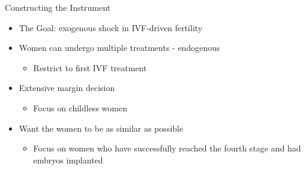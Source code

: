 \documentclass[11pt,notes=hide,aspectratio=169,mathserif]{beamer}
\begin{document}
\begin{frame}{Constructing the Instrument}
\small
\begin{itemize}
  \item The Goal: exogenous shock in IVF-driven fertility
  \item Women can undergo multiple treatments - endogenous
  \begin{itemize}
\item Restrict to first IVF treatment
  \end{itemize}
  \item Extensive margin decision 
  \begin{itemize}
    \item Focus on childless women
  \end{itemize}
  \item Want the women to be as similar as possible
  \begin{itemize}
    \item Focus on women who have successfully reached the fourth stage and had embryos implanted
  \end{itemize}
\end{itemize}
\end{frame}
\end{document}
